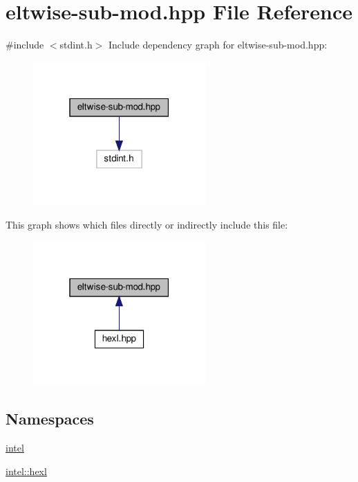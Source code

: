 \hypertarget{eltwise-sub-mod_8hpp}{}\section{eltwise-\/sub-\/mod.hpp File Reference}
\label{eltwise-sub-mod_8hpp}
{\ttfamily \#include $<$stdint.\+h$>$}\newline
Include dependency graph for eltwise-\/sub-\/mod.hpp\+:
\nopagebreak
\begin{figure}[H]
\begin{center}
\leavevmode
\includegraphics[width=187pt]{eltwise-sub-mod_8hpp__incl}
\end{center}
\end{figure}
This graph shows which files directly or indirectly include this file\+:
\nopagebreak
\begin{figure}[H]
\begin{center}
\leavevmode
\includegraphics[width=187pt]{eltwise-sub-mod_8hpp__dep__incl}
\end{center}
\end{figure}
\subsection*{Namespaces}
\begin{DoxyCompactItemize}
\item 
 \hyperlink{namespaceintel}{intel}
\item 
 \hyperlink{namespaceintel_1_1hexl}{intel\+::hexl}
\end{DoxyCompactItemize}
